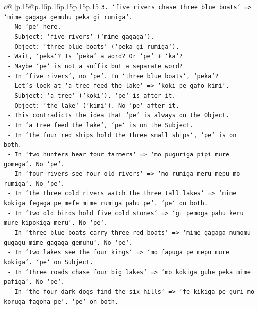 \documentclass{article}
\begin{document}
{\begin{supertabular}{c@{$\;$}|p{.15\linewidth}@{}p{.15\linewidth}p{.15\linewidth}p{.15\linewidth}p{.15\linewidth}p{.15\linewidth}}
{{{\texttt{3. `five rivers chase three blue boats` => `mime gagaga gemuhu peka gi rumiga`.} \\
\texttt{   {-} No `pe` here.} \\
\texttt{   {-} Subject: `five rivers` (`mime gagaga`).} \\
\texttt{   {-} Object: `three blue boats` (`peka gi rumiga`).} \\
\texttt{   {-} Wait, `peka`? Is `peka` a word? Or `pe` + `ka`?} \\
\texttt{   {-} Maybe `pe` is not a suffix but a separate word?} \\
\texttt{   {-} In `five rivers`, no `pe`. In `three blue boats`, `peka`?} \\
\texttt{   {-} Let's look at `a tree feed the lake` => `koki pe gafo kimi`.} \\
\texttt{   {-} Subject: `a tree` (`koki`). `pe` is after it.} \\
\texttt{   {-} Object: `the lake` (`kimi`). No `pe` after it.} \\
\texttt{   {-} This contradicts the idea that `pe` is always on the Object.} \\
\texttt{   {-} In `a tree feed the lake`, `pe` is on the Subject.} \\
\texttt{   {-} In `the four red ships hold the three small ships`, `pe` is on both.} \\
\texttt{   {-} In `two hunters hear four farmers` => `mo puguriga pipi mure gomega`. No `pe`.} \\
\texttt{   {-} In `four rivers see four old rivers` => `mo rumiga meru mepu mo rumiga`. No `pe`.} \\
\texttt{   {-} In `the three cold rivers watch the three tall lakes` => `mime kokiga fegaga pe mefe mime rumiga pahu pe`. `pe` on both.} \\
\texttt{   {-} In `two old birds hold five cold stones` => `gi pemoga pahu keru mure kipokiga meru`. No `pe`.} \\
\texttt{   {-} In `three blue boats carry three red boats` => `mime gagaga mumomu gugagu mime gagaga gemuhu`. No `pe`.} \\
\texttt{   {-} In `two lakes see the four kings` => `mo fapuga pe mepu mure kokiga`. `pe` on Subject.} \\
\texttt{   {-} In `three roads chase four big lakes` => `mo kokiga guhe peka mime pafiga`. No `pe`.} \\
\texttt{   {-} In `the four dark dogs find the six hills` => `fe kikiga pe guri mo koruga fagoha pe`. `pe` on both.} \\
}}}
\end{supertabular}}
\end{document}
